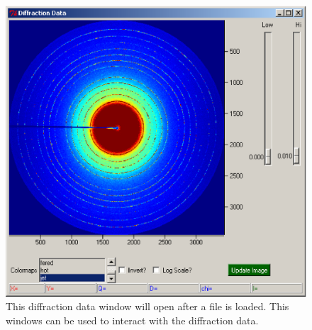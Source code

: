 \begin{figure}
    \centering
    \includegraphics[scale=.75]
    {figures/diffraction_data_window.eps}
    \caption{This diffraction data window will open after 
    a file is loaded. This windows can be used to interact 
    with the diffraction data.} 
    \label{diffraction_data_window}
\end{figure}

